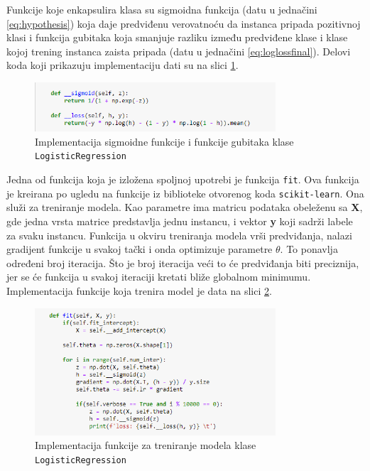 \documentclass[a4paper,12pt]{report}
\begin{document}
Funkcije koje enkapsulira klasa su sigmoidna funkcija (datu u jednačini \ref{eq:hypothesis}) koja daje predviđenu verovatnoću da instanca pripada pozitivnoj klasi i funkcija gubitaka koja smanjuje razliku između predviđene klase i klase kojoj trening instanca zaista pripada (datu u jednačini \ref{eq:loglossfinal}). Delovi koda koji prikazuju implementaciju dati su na slici \ref{fig:logsigloss}.

\begin{figure}[h]
    \centering
    \includegraphics[width=0.8\textwidth]{logistic_sigmoid_loss.png}
    \caption{Implementacija sigmoidne funkcije i funkcije gubitaka klase \texttt{LogisticRegression}}\label{fig:logsigloss}
\end{figure}

Jedna od funkcija koja je izložena spoljnoj upotrebi je funkcija \texttt{fit}. Ova funkcija je kreirana po ugledu na funkcije iz biblioteke otvorenog koda \texttt{scikit-learn}. Ona služi za treniranje modela. Kao parametre ima matricu podataka obeleženu sa \textbf{X}, gde jedna vrsta matrice predstavlja jednu instancu, i vektor \textbf{y} koji sadrži labele za svaku instancu. Funkcija u okviru treniranja modela vrši predviđanja, nalazi gradijent funkcije u svakoj tački i onda optimizuje parametre $\theta$. To ponavlja određeni broj iteracija. Što je broj iteracija veći to 
će predviđanja biti preciznija, jer se će funkcija u svakoj iteraciji kretati bliže globalnom minimumu. Implementacija funkcije koja trenira model je data na slici \ref{fig:logfit}.

\begin{figure}[h]
    \centering
    \includegraphics[width=0.8\textwidth]{logistic_fit.png}
    \caption{Implementacija funkcije za treniranje modela klase \texttt{LogisticRegression}}\label{fig:logfit}
\end{figure}
\end{document}
